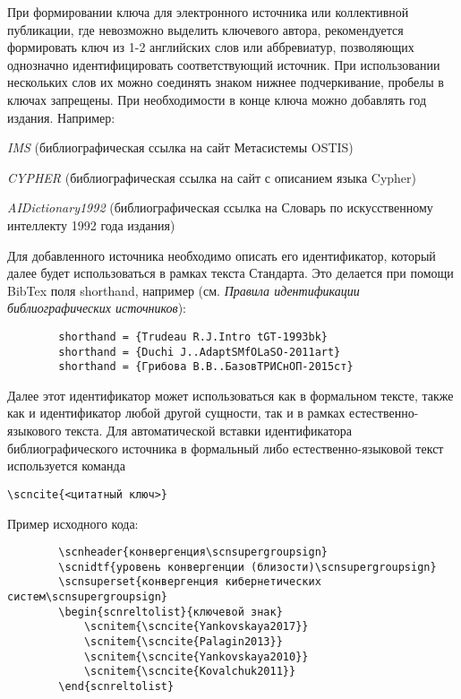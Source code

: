 \begin{textitemize}
	При формировании ключа для электронного источника или коллективной публикации, где невозможно выделить ключевого автора, рекомендуется формировать ключ из 1-2 английских слов или аббревиатур, позволяющих однозначно идентифицировать соответствующий источник. При использовании нескольких слов их можно соединять знаком нижнее подчеркивание, пробелы в ключах запрещены. При необходимости в конце ключа можно добавлять год издания. Например:
	
	\begin{textitemize}
		\item \textit{IMS} (библиографическая ссылка на сайт Метасистемы OSTIS)
		\item \textit{CYPHER} (библиографическая ссылка на сайт с описанием языка Cypher)
		\item \textit{AIDictionary1992} (библиографическая ссылка на Словарь по искусственному интеллекту 1992 года издания)
	\end{textitemize}
	
	Для добавленного источника необходимо описать его идентификатор, который далее будет использоваться в рамках текста Стандарта. Это делается при помощи BibTex поля shorthand, например (см. \textit{Правила идентификации библиографических источников}):
	
	\begin{verbatim}
		shorthand = {Trudeau R.J.Intro tGT-1993bk}
		shorthand = {Duchi J..AdaptSMfOLaSO-2011art}
		shorthand = {Грибова В.В..БазовТРИСнОП-2015ст}
	\end{verbatim}
	
	Далее этот идентификатор может использоваться как в формальном тексте, также как и идентификатор любой другой сущности, так и в рамках естественно-языкового текста. Для автоматической вставки идентификатора библиографического источника в формальный либо естественно-языковой текст используется команда \begin{verbatim}\scncite{<цитатный ключ>}\end{verbatim}
	
	Пример исходного кода:
	
	\begin{verbatim}
		\scnheader{конвергенция\scnsupergroupsign}
		\scnidtf{уровень конвергенции (близости)\scnsupergroupsign}
		\scnsuperset{конвергенция кибернетических систем\scnsupergroupsign}
		\begin{scnreltolist}{ключевой знак}
			\scnitem{\scncite{Yankovskaya2017}}
			\scnitem{\scncite{Palagin2013}}
			\scnitem{\scncite{Yankovskaya2010}}
			\scnitem{\scncite{Kovalchuk2011}}
		\end{scnreltolist}		
	\end{verbatim}
	

\end{textitemize}
